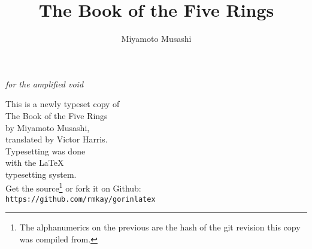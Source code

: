 \documentclass[paper=a6]{book}
\begin{document}
\pagestyle{empty}
\setcounter{secnumdepth}{-1} 
\setlength{\parindent}{0cm}




\vspace*{2cm}
\begin{center}
\textit{for the amplified void}
\end{center}
\cleardoublepage
\begin{figure}
\begin{alltt}
\singlespacing
\centering
\texttt{}
\end{alltt}
\end{figure}
\clearpage

\begin{center}
\vspace*{1cm}
This is a newly typeset copy of \\ 
The Book of the Five Rings\\ 
by Miyamoto Musashi,\\
translated by Victor Harris.\\
\vspace{2cm}
Typesetting was done \\ 
with the \LaTeX \\
typesetting system.\\
\vfill
Get the source\footnote{The alphanumerics on the previous are the hash of the git revision this copy was compiled from.} or fork it on Github:\\
\texttt{https://github.com/rmkay/gorinlatex}\\


\end{center}

\title{\textbf{The Book of the Five Rings}}
\author{Miyamoto Musashi}
\date{}
\maketitle
\end{document}
